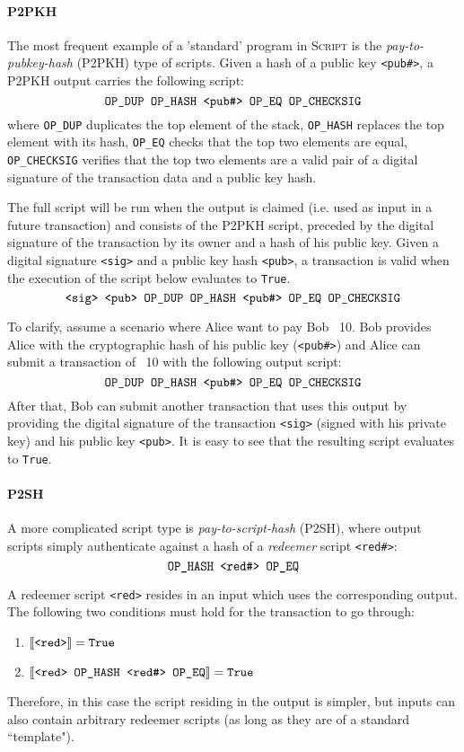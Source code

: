 \documentclass[acmsmall,nonacm=true,screen=true]{acmart}
\begin{document}
\newcommand\ttt{\texttt}
\newcommand\stack[1]{\text{\ttt{#1}}}
\newcommand\Semantics[1]{\llbracket \stack{#1} \rrbracket}

\paragraph{P2PKH}
The most frequent example of a 'standard' program in \textsc{Script} is the
\textit{pay-to-pubkey-hash} (P2PKH) type of scripts. Given a hash of a public key \texttt{<pub\#>},
a P2PKH output carries the following script:
\[
  \stack{OP\_DUP OP\_HASH <pub\#> OP\_EQ OP\_CHECKSIG}
\]
where \ttt{OP\_DUP} duplicates the top element of the stack, \ttt{OP\_HASH} replaces the top element with its hash,
\ttt{OP\_EQ} checks that the top two elements are equal, \ttt{OP\_CHECKSIG} verifies that the top two elements
are a valid pair of a digital signature of the transaction data and a public key hash.

The full script will be run when the output is claimed (i.e. used as input in a future transaction)
and consists of the P2PKH script, preceded by the digital signature of the transaction by its owner and a hash of
his public key. Given a digital signature \ttt{<sig>} and a public key hash \ttt{<pub>}, a transaction is valid
when the execution of the script below evaluates to \ttt{True}.
\[
  \stack{<sig> <pub> OP\_DUP OP\_HASH <pub\#> OP\_EQ OP\_CHECKSIG}
\]

To clarify, assume a scenario where Alice want to pay Bob \bitcoin ~10.
Bob provides Alice with the cryptographic hash of his public key (\ttt{<pub\#>})
and Alice can submit a transaction of \bitcoin ~10 with the following output script:
\[
  \stack{OP\_DUP OP\_HASH <pub\#> OP\_EQ OP\_CHECKSIG}
\]
After that, Bob can submit another transaction that uses this output by providing the digital signature
of the transaction \ttt{<sig>} (signed with his private key) and his public key \ttt{<pub>}.
It is easy to see that the resulting script evaluates to \ttt{True}.

\paragraph{P2SH}
A more complicated script type is \textit{pay-to-script-hash} (P2SH), where output scripts simply authenticate
against a hash of a \textit{redeemer} script \ttt{<red\#>}:
\[
  \stack{OP\_HASH <red\#> OP\_EQ}
\]

A redeemer script \ttt{<red>} resides in an input which uses the corresponding output. The following two conditions
must hold for the transaction to go through:
\begin{enumerate}
\item $\Semantics{<red>} = \stack{True}$
\item $\Semantics{<red> OP\_HASH <red\#> OP\_EQ} = \stack{True}$
\end{enumerate}
Therefore, in this case the script residing in the output is simpler, but inputs can also contain arbitrary redeemer scripts
(as long as they are of a standard ``template").
\end{document}

